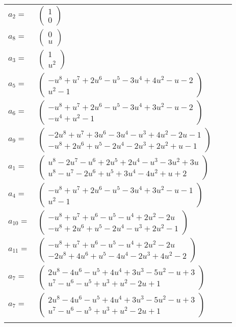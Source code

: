 \documentclass[1p]{elsarticle_modified}
\theoremstyle{definition}
\begin{document}
\begin{tabular}{m{7pt} m{180pt} m{7pt} m{180pt} }
\flushright $a_{2}=$&$\begin{pmatrix}1\\0\end{pmatrix}$ \\
\flushright $a_{8}=$&$\begin{pmatrix}0\\u\end{pmatrix}$ \\
\flushright $a_{3}=$&$\begin{pmatrix}1\\u^2\end{pmatrix}$ \\
\flushright $a_{5}=$&$\begin{pmatrix}- u^8+u^7+2 u^6- u^5-3 u^4+4 u^2- u-2\\u^2-1\end{pmatrix}$ \\
\flushright $a_{6}=$&$\begin{pmatrix}- u^8+u^7+2 u^6- u^5-3 u^4+3 u^2- u-2\\- u^4+u^2-1\end{pmatrix}$ \\
\flushright $a_{9}=$&$\begin{pmatrix}-2 u^8+u^7+3 u^6-3 u^4- u^3+4 u^2-2 u-1\\- u^8+2 u^6+u^5-2 u^4-2 u^3+2 u^2+u-1\end{pmatrix}$ \\
\flushright $a_{1}=$&$\begin{pmatrix}u^8-2 u^7- u^6+2 u^5+2 u^4- u^3-3 u^2+3 u\\u^8- u^7-2 u^6+u^5+3 u^4-4 u^2+u+2\end{pmatrix}$ \\
\flushright $a_{4}=$&$\begin{pmatrix}- u^8+u^7+2 u^6- u^5-3 u^4+3 u^2- u-1\\u^2-1\end{pmatrix}$ \\
\flushright $a_{10}=$&$\begin{pmatrix}- u^8+u^7+u^6- u^5- u^4+2 u^2-2 u\\- u^8+2 u^6+u^5-2 u^4- u^3+2 u^2-1\end{pmatrix}$ \\
\flushright $a_{11}=$&$\begin{pmatrix}- u^8+u^7+u^6- u^5- u^4+2 u^2-2 u\\-2 u^8+4 u^6+u^5-4 u^4-2 u^3+4 u^2-2\end{pmatrix}$ \\
\flushright $a_{7}=$&$\begin{pmatrix}2 u^8-4 u^6- u^5+4 u^4+3 u^3-5 u^2- u+3\\u^7- u^6- u^5+u^3+u^2-2 u+1\end{pmatrix}$\\ \flushright $a_{7}=$&$\begin{pmatrix}2 u^8-4 u^6- u^5+4 u^4+3 u^3-5 u^2- u+3\\u^7- u^6- u^5+u^3+u^2-2 u+1\end{pmatrix}$\\&\end{tabular}
\end{document}

